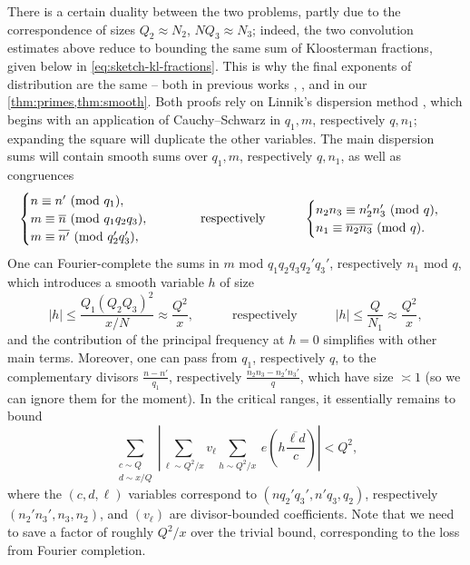 \documentclass[reqno,11pt]{amsart}
\theoremstyle{remark}
\numberwithin{equation}{section}
\renewcommand{\bar}{\overline}
\renewcommand{\pmod}[1]{\ (\textnormal{mod } #1)}
\begin{document}
There is a certain duality between the two problems, partly due to the correspondence of sizes $Q_2 \approx N_2$, $N Q_3 \approx N_3$; indeed, the two convolution estimates above reduce to bounding the same sum of Kloosterman fractions, given below in \cref{eq:sketch-kl-fractions}. This is why the final exponents of distribution are the same -- both in previous works \cite{maynard2025primes2,drappeau2015theoremes}, \cite{lichtman2023primes,pascadi2023smooth}, and in our \cref{thm:primes,thm:smooth}. Both proofs rely on Linnik's dispersion method \cite{linnik1963dispersion,bombieri1986primes,bombieri1987primes2,bombieri1989primes3}, which begins with an application of Cauchy--Schwarz in $q_1, m$, respectively $q, n_1$; expanding the square will duplicate the other variables. The main dispersion sums will contain smooth sums over $q_1, m$, respectively $q, n_1$, as well as congruences
\[
    \begin{cases}
    n \equiv n' \pmod{q_1}, \\
    m \equiv \bar{n} \pmod{q_1 q_2 q_3}, \\
    m \equiv \bar{n'} \pmod{q_2' q_3'},
    \end{cases}
    \qquad\quad 
    \text{respectively}
    \qquad\quad 
    \begin{cases}
    n_2n_3 \equiv n_2'n_3' \pmod{q}, \\
    n_1 \equiv \bar{n_2 n_3} \pmod{q}.
    \end{cases}
\]
One can Fourier-complete the sums in $m$ mod $q_1q_2q_3q_2'q_3'$, respectively $n_1$ mod $q$, which introduces a smooth variable $h$ of size
\[
    |h| \le \frac{Q_1 (Q_2 Q_3)^2}{x/N} \approx \frac{Q^2}{x},
    \qquad\quad
    \text{respectively}
    \qquad\quad
    |h| \le \frac{Q}{N_1} \approx \frac{Q^2}{x},
\]
and the contribution of the principal frequency at $h = 0$ simplifies with other main terms. Moreover, one can pass from $q_1$, respectively $q$, to the complementary divisors $\tfrac{n-n'}{q_1}$, respectively $\tfrac{n_2n_3 - n_2'n_3'}{q}$, which have size $\asymp 1$ (so we can ignore them for the moment). In the critical ranges, it essentially remains to bound
\begin{equation} \label{eq:sketch-kl-fractions}
    \sum_{\substack{c \sim Q \\ d \sim x/Q}} \left\vert \sum_{\ell \sim Q^2/x} v_\ell \sum_{h \sim Q^2/x}\ e\left(h\frac{\bar{\ell d}}{c}\right) \right\vert
    < Q^2,
\end{equation}
where the $(c, d, \ell)$ variables correspond to $(nq_2'q_3', n'q_3, q_2)$, respectively $(n_2'n_3', n_3, n_2)$, and $(v_\ell)$ are divisor-bounded coefficients. Note that we need to save a factor of roughly $Q^2/x$ over the trivial bound, corresponding to the loss from Fourier completion.
\end{document}
